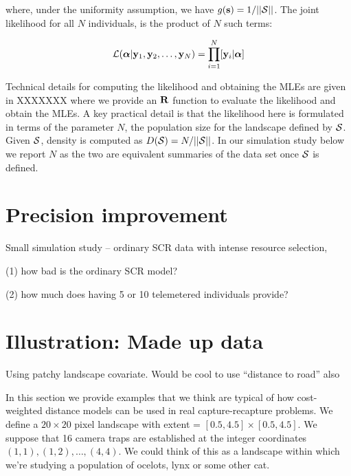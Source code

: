 {\flushleft where}, under the uniformity assumption, we have
$g({\bf s}) = 1/||{\cal S}||$.
The joint likelihood for all $N$ individuals, 
is the product of $N$ such terms:

\[
{\cal L}({\bm \alpha} | {\bf y}_{1},{\bf y}_{2},\ldots, {\bf y}_{N}) = \prod_{i=1}^{N}
[{\bf y}_{i}|{\bm \alpha}]
\]

Technical details for computing the likelihood and obtaining the MLEs
are given in XXXXXXX where we provide an ${\bf R}$ function to
evaluate the likelihood and obtain the MLEs.  A key practical detail
is that the likelihood here is formulated in terms of the parameter
$N$, the population size for the landscape defined by ${\cal
  S}$. Given ${\cal S}$, density is computed as $D({\cal S}) =
N/||{\cal S}||$. In our simulation study below we report $N$ as the
two are equivalent summaries of the data set once ${\cal S}$ is
defined.

\section{Precision improvement}

Small simulation study -- ordinary SCR data with intense resource selection,

(1) how bad is the ordinary SCR model?

(2) how much does having 5 or 10 telemetered individuals provide?


\section{Illustration: Made up data}

Using patchy landscape covariate.
Would be cool to use ``distance to road'' also


In this section we provide examples that we think are typical of how
cost-weighted distance models can be used in real capture-recapture
problems.  We define a $20 \times 20$ pixel landscape with 
extent = $[0.5, 4.5] \times [0.5, 4.5]$.  
We suppose that 16 camera traps are established at the integer coordinates
$(1,1), (1,2), \ldots, (4,4)$. We could think of this as a landscape
within which we're studying a population of ocelots, lynx or some
other cat.

